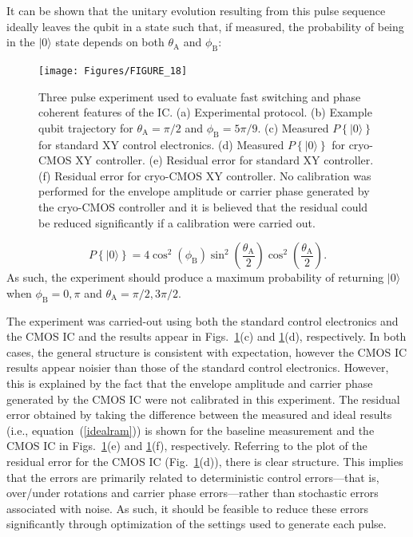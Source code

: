 \documentclass[journal]{IEEEtran}
\newcommand{\CR}[1]{{\color{black}#1}}
\begin{document}
It can be shown that the unitary evolution \CR{resulting} from this pulse sequence ideally leaves the qubit in a state such that, if measured, the probability of being in the $|0\rangle$ state depends on both $\theta_\text{A}$ and $\phi_\text{B}$:  
\begin{figure}[bt!]
\texttt{[image: Figures/FIGURE\_18]}
\caption{Three pulse experiment used to evaluate fast switching and phase coherent features of the IC. (a) Experimental protocol. (b) Example qubit trajectory for $\theta_\text{A}=\pi/2$ and $\phi_\text{B}=5\pi/9$. (c) Measured $P\left\{|0\rangle\right\}$ for standard XY control electronics. (d) Measured $P\left\{|0\rangle\right\}$ for cryo-CMOS XY controller. (e) Residual error for standard XY controller. (f) Residual error for cryo-CMOS XY controller. No calibration was performed for the envelope amplitude or carrier phase generated by the cryo-CMOS controller and it is believed that the residual could be  reduced significantly if a calibration were carried out.}
\label{Ramsey}
\end{figure}
\begin{equation}
P\left\{|0\rangle\right\}=4\cos^2\left(\phi_\text{B}\right)\sin^2\left(\frac{\theta_\text{A}}{2}\right)\cos^2\left(\frac{\theta_\text{A}}{2}\right).\label{idealram}
\end{equation}
As such, the experiment should produce a maximum probability of returning $|0\rangle$ when $\phi_\text{B}=0,\pi$ and $\theta_\text{A}=\pi/2,3\pi/2$.

The experiment was carried-out using both the standard control electronics and the CMOS IC and the results appear in Figs.~\ref{Ramsey}(c) and \ref{Ramsey}(d), respectively. In both cases, the general structure is consistent with expectation, however the CMOS IC results appear noisier than those of the standard control electronics. However, this is explained by the fact that the envelope amplitude and carrier phase generated by the CMOS IC were not calibrated in this experiment. The residual error obtained by taking the difference between the measured and ideal results (i.e., equation~(\ref{idealram})) is shown for the baseline measurement and the CMOS IC in Figs.~\ref{Ramsey}(e) and \ref{Ramsey}(f), respectively. \CR{Referring to the plot of the residual error for the CMOS IC (Fig.~\ref{Ramsey}(d)), there is clear structure. This implies that the errors are primarily related to deterministic control errors---that is, over/under rotations and carrier phase errors---rather than stochastic errors associated with noise. As such, it should be feasible to reduce these errors significantly through optimization of the settings used to generate each pulse.}
\end{document}

